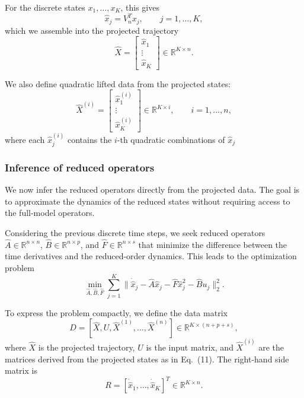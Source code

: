 \documentclass{article}
\begin{document}
For the discrete states $x_1, \dots, x_K$, this gives
\[
\hat{x}_j = V_n^T x_j, \qquad j = 1,\dots,K,
\]
which we assemble into the projected trajectory
\[
\hat{X} = 
\begin{bmatrix}
\hat{x}_1 \\
\vdots \\
\hat{x}_K
\end{bmatrix}
\in \mathbb{R}^{K \times n}.
\]

We also define quadratic lifted data from the projected states:
\[
\hat{X}^{(i)} =
\begin{bmatrix}
\hat{x}_1^{(i)} \\
\vdots \\
\hat{x}_K^{(i)}
\end{bmatrix}
\in \mathbb{R}^{K \times i},
\qquad i=1,\dots,n,
\]
where each $\hat{x}_j^{(i)}$ contains the $i$-th quadratic combinations of $\hat{x}_j$



\vspace{1cm}


\subsubsection*{Inference of reduced operators}

\vspace{1cm}

We now infer the reduced operators directly from the projected data. 
The goal is to approximate the dynamics of the reduced states without 
requiring access to the full-model operators.

Considering the previous discrete time steps, we seek reduced operators $\hat{A} \in \mathbb{R}^{n \times n}$, 
$\hat{B} \in \mathbb{R}^{n \times p}$, and 
$\hat{F} \in \mathbb{R}^{n \times s}$ 
that minimize the difference between the time derivatives 
and the reduced-order dynamics. This leads to the optimization problem
\begin{equation}
    \min_{\hat{A}, \hat{B}, \hat{F}} 
    \sum_{j=1}^K \big\| \dot{\hat{x}}_j - \hat{A}\hat{x}_j - \hat{F}\hat{x}_j^2 - \hat{B}u_j \big\|_2^2.
\end{equation}


To express the problem compactly, we define the data matrix
\begin{equation}
    D = [\hat{X}, U, \hat{X}^{(1)}, \dots, \hat{X}^{(n)}] \in \mathbb{R}^{K \times (n+p+s)},
\end{equation}
where $\hat{X}$ is the projected trajectory, $U$ is the input matrix, 
and $\hat{X}^{(i)}$ are the matrices derived from the projected states 
as in Eq.~(11). The right-hand side matrix is
\begin{equation}
    R = [\dot{\hat{x}}_1, \dots, \dot{\hat{x}}_K]^T \in \mathbb{R}^{K \times n}.
\end{equation}
\end{document}
